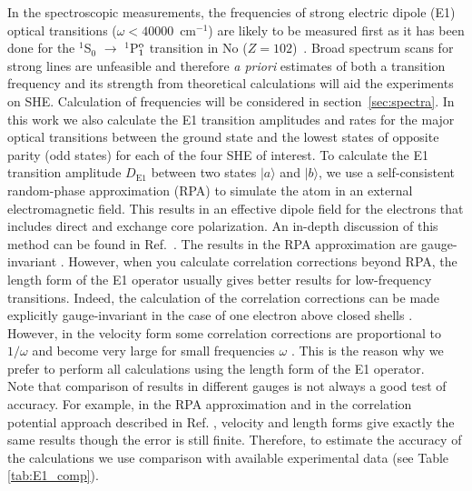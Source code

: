 \documentclass[10pt,a4paper, twoside]{report}
\begin{document}
In the spectroscopic measurements, the frequencies of strong electric dipole (E1) optical transitions ($\omega < 40 000$~cm$^{-1}$) are likely to be measured first as it has been done for the $^1$S$_0$ $\rightarrow$ $^1$P$_1^{\rm o}$ transition in No ($Z=102$)~\cite{Laatiaoui2016}. Broad spectrum scans for strong lines are unfeasible and therefore \textit{a priori} estimates of both a transition frequency and its strength from theoretical calculations will aid the experiments on SHE. Calculation of frequencies will be considered in section~\ref{sec:spectra}. In this work we also calculate the E1 transition amplitudes and rates for the major optical  transitions between the ground state and the  lowest states of opposite parity (odd states) for each of the four SHE of interest. 
\linebreak
To calculate the E1 transition amplitude $D_{\text{E1}}$ between two states $|a\rangle$ and $|b\rangle$, we use a self-consistent random-phase approximation (RPA) to simulate the atom in an external electromagnetic field. This results in an effective dipole field for the electrons that includes direct and exchange core polarization. An in-depth discussion of this method can be found in Ref.~\cite{DFSS1986, Dzuba2018}. The results in the  RPA approximation are gauge-invariant \cite{DFSS1986}. However, when you calculate correlation corrections beyond RPA, the length form of the E1 operator usually gives better results for low-frequency transitions. Indeed, the calculation of the correlation corrections can be made explicitly gauge-invariant in the case of one electron above closed shells \cite{DFSS1987_2, DFSS1987}. However, in the velocity form some correlation corrections are proportional to $1/\omega$ and become very large for small frequencies $\omega$  \cite{DFSS1987_2, DFSS1987}. This is the reason why we prefer to perform all calculations using the length form of the E1 operator. \\

Note that comparison of results in different gauges is not always a good test of accuracy. For example, in the RPA approximation and in the correlation potential approach described in Ref. \cite{DFSS1987_2, DFSS1987}, velocity and length forms give exactly the same results though the error is still finite. Therefore, to estimate the accuracy of the calculations we use comparison with available experimental data (see Table \ref{tab:E1_comp}).\\
\end{document}
